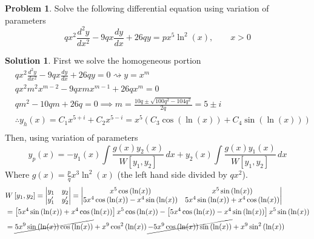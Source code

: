 \documentclass[10pt]{article}
\theoremstyle{definition}
\newtheorem{problem}{Problem}
\newtheorem{soln}{Solution}
\begin{document}
\begin{problem}
Solve the following differential equation using variation of parameters
$$qx^2\frac{d^2y}{dx^2}-9qx\frac{dy}{dx}+26qy=px^5\ln^2\left(x\right),\qquad x>0$$
\end{problem}
\begin{soln} First we solve the homogeneous portion
  \begin{align*}
     & qx^2\frac{d^2y}{dx^2}-9qx\frac{dy}{dx}+26qy=0 \rightsquigarrow y=x^m                                          \\
     & qx^2m^2x^{m-2}-9qxmx^{m-1}+26qx^m=0                                                                           \\
     & qm^2 -10qm+26q=0 \implies m=\frac{10q\pm\sqrt{100q^2-104q^2}}{2q}=5\pm i                                      \\
     & \therefore y_h(x)=C_1x^{5+i}+C_2x^{5-i}=x^5\left(C_3\cos\left(\ln(x)\right)+C_4\sin\left(\ln(x)\right)\right) \\
  \end{align*}
  Then, using variation of parameters
  $$y_p(x)=-y_1(x)\int\frac{g(x)y_2(x)}{W\left[y_1,y_2\right]}\,dx+y_2(x)\int\frac{g(x)y_1(x)}{W\left[y_1,y_2\right]}\,dx$$
  Where $g(x)=\frac{p}{q}x^3\ln^2\left(x\right)$ (the left hand side divided by $qx^2$).
  \begin{align*}
     & W\left[y_1,y_2\right]=
    \begin{vmatrix}
      y_1        & y_2        \\
      y_1^\prime & y_2^\prime
    \end{vmatrix}
    =
    \begin{vmatrix}
      x^5\cos\left(\ln(x)\right)                             & x^5\sin\left(\ln(x)\right)                             \\
      5x^4\cos\left(\ln(x)\right)-x^4\sin\left(\ln(x)\right) & 5x^4\sin\left(\ln(x)\right)+x^4\cos\left(\ln(x)\right)
    \end{vmatrix} \\
     & = \left[5x^4\sin\left(\ln(x)\right)+x^4\cos\left(\ln(x)\right)\right]x^5\cos\left(\ln(x)\right)
    -\left[5x^4\cos\left(\ln(x)\right)-x^4\sin\left(\ln(x)\right)\right]x^5\sin\left(\ln(x)\right)                  \\
     & = \cancel{5x^9\sin\left(\ln(x)\right)\cos\left(\ln(x)\right)}+x^9\cos^2\left(\ln(x)\right)
    \cancel{-5x^9\cos\left(\ln(x)\right)\sin\left(\ln(x)\right)} +x^9\sin^2\left(\ln(x)\right)                      \\

\end{align*}
\end{soln}
\end{document}
